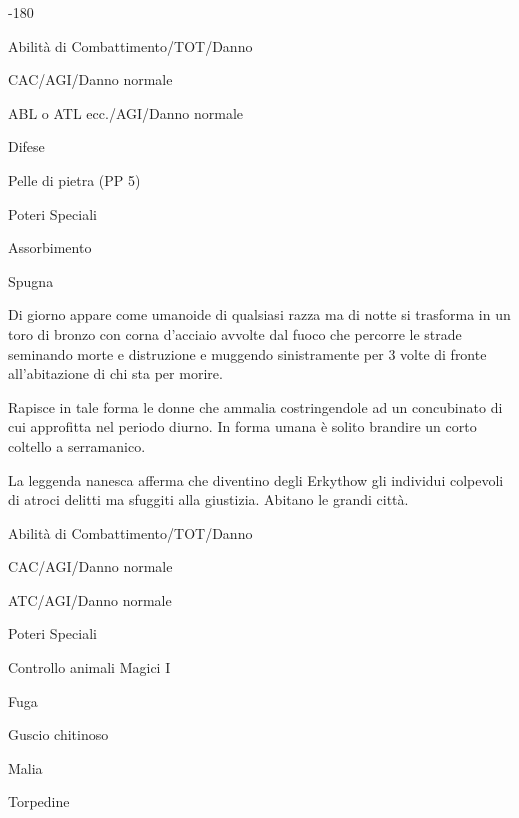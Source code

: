 {-}{180}

\begin{parmostro}{Abilit\`a di Combattimento/TOT/Danno}
\item CAC/AGI/Danno normale
\item ABL o ATL ecc./AGI/Danno normale
\end{parmostro}

\begin{parmostro}{Difese}
\item Pelle di pietra (PP 5)
\end{parmostro}

\begin{parmostro}{Poteri Speciali}
\item  Assorbimento 
\item Spugna
\end{parmostro}


Di giorno appare come umanoide di qualsiasi razza ma di notte si
trasforma in un toro di bronzo con corna d'acciaio avvolte dal fuoco
che percorre le strade seminando morte e distruzione e muggendo
sinistramente per 3 volte di fronte all'abitazione di chi sta per
morire.

Rapisce in tale forma le donne che ammalia costringendole ad un
concubinato di cui approfitta nel periodo diurno. In forma umana \`e
solito brandire un corto coltello a serramanico. 

La leggenda nanesca afferma che diventino degli Erkythow gli individui
colpevoli di atroci delitti ma sfuggiti alla giustizia. Abitano le
grandi citt\`a.  


\begin{parmostro}{Abilit\`a di Combattimento/TOT/Danno}
\item  CAC/AGI/Danno normale
\item  ATC/AGI/Danno normale
\end{parmostro}

\begin{parmostro}{Poteri Speciali}
\item Controllo animali Magici I
\item Fuga
\item Guscio chitinoso
\item Malia
\item Torpedine
\end{parmostro}

